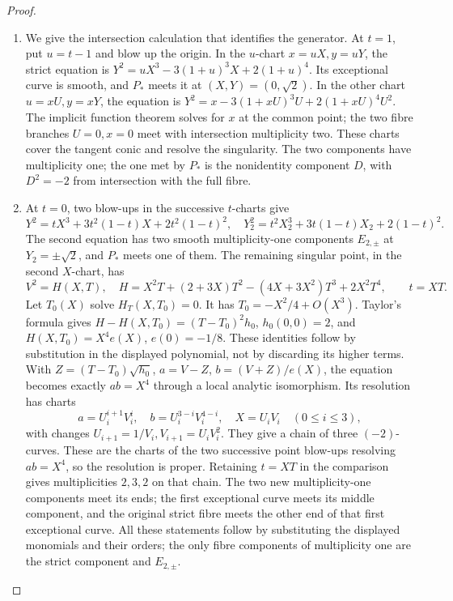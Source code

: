 \begin{proof}
\begin{enumerate}[label=\arabic*.,leftmargin=*]
\item We give the intersection calculation that identifies the generator. At $t=1$, put $u=t-1$ and blow up the origin. In the $u$-chart $x=uX,y=uY$, the strict equation is
$Y^2=uX^3-3(1+u)^3X+2(1+u)^4$. Its exceptional curve is smooth, and $P_*$ meets it at $(X,Y)=(0,\sqrt2)$. In the other chart $u=xU,y=xY$, the equation is $Y^2=x-3(1+xU)^3U+2(1+xU)^4U^2$. The implicit function theorem solves for $x$ at the common point; the two fibre branches $U=0,x=0$ meet with intersection multiplicity two. These charts cover the tangent conic and resolve the singularity. The two components have multiplicity one; the one met by $P_*$ is the nonidentity component $D$, with $D^2=-2$ from intersection with the full fibre.

\item At $t=0$, two blow-ups in the successive $t$-charts give
\[
 Y^2=tX^3+3t^2(1-t)X+2t^2(1-t)^2,
\quad
 Y_2^2=t^2X_2^3+3t(1-t)X_2+2(1-t)^2.
\]
The second equation has two smooth multiplicity-one components $E_{2,\pm}$ at $Y_2=\pm\sqrt2$, and $P_*$ meets one of them. The remaining singular point, in the second $X$-chart, has
\[
 V^2=H(X,T),\quad H=X^2T+(2+3X)T^2-(4X+3X^2)T^3+2X^2T^4,
 \qquad t=XT.
\]
Let $T_0(X)$ solve $H_T(X,T_0)=0$. It has $T_0=-X^2/4+O(X^3)$. Taylor's formula gives
$H-H(X,T_0)=(T-T_0)^2h_0$, $h_0(0,0)=2$, and $H(X,T_0)=X^4e(X)$, $e(0)=-1/8$. These identities follow by substitution in the displayed polynomial, not by discarding its higher terms. With $Z=(T-T_0)\sqrt{h_0}$, $a=V-Z$, $b=(V+Z)/e(X)$, the equation becomes exactly $ab=X^4$ through a local analytic isomorphism. Its resolution has charts
\[
 a=U_i^{i+1}V_i^i,\quad b=U_i^{3-i}V_i^{4-i},\quad X=U_iV_i
 \quad(0\le i\le3),
\]
with changes $U_{i+1}=1/V_i,V_{i+1}=U_iV_i^2$. They give a chain of three $(-2)$-curves. These are the charts of the two successive point blow-ups resolving $ab=X^4$, so the resolution is proper. Retaining $t=XT$ in the comparison gives multiplicities $2,3,2$ on that chain. The two new multiplicity-one components meet its ends; the first exceptional curve meets its middle component, and the original strict fibre meets the other end of that first exceptional curve. All these statements follow by substituting the displayed monomials and their orders; the only fibre components of multiplicity one are the strict component and $E_{2,\pm}$.


\end{enumerate}
\end{proof}
